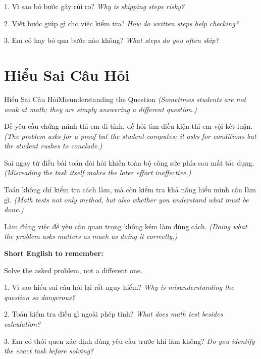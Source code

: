 \begin{tuhocnhanh}
1. Vì sao bỏ bước gây rủi ro? \textit{Why is skipping steps risky?}

2. Viết bước giúp gì cho việc kiểm tra? \textit{How do written steps help checking?}

3. Em có hay bỏ qua bước nào không? \textit{What steps do you often skip?}
\end{tuhocnhanh}
\ngancach

\section{Hiểu Sai Câu Hỏi}
\begin{truyen}{Hiểu Sai Câu Hỏi}{Misunderstanding the Question}
\textit{(Sometimes students are not weak at math; they are simply answering a different question.)}

Đề yêu cầu chứng minh thì em đi tính, đề hỏi tìm điều kiện thì em vội kết luận.
\textit{(The problem asks for a proof but the student computes; it asks for conditions but the student rushes to conclude.)}

Sai ngay từ điều bài toán đòi hỏi khiến toàn bộ công sức phía sau mất tác dụng.
\textit{(Misreading the task itself makes the later effort ineffective.)}

Toán không chỉ kiểm tra cách làm, mà còn kiểm tra khả năng hiểu mình cần làm gì.
\textit{(Math tests not only method, but also whether you understand what must be done.)}
\end{truyen}

\begin{baihoc}
Làm đúng việc đề yêu cầu quan trọng không kém làm đúng cách.
\textit{(Doing what the problem asks matters as much as doing it correctly.)}
\end{baihoc}

\begin{ghinhoanh}
\textbf{Short English to remember:}

Solve the asked problem, not a different one.

\end{ghinhoanh}

\begin{tuhocnhanh}
1. Vì sao hiểu sai câu hỏi lại rất nguy hiểm? \textit{Why is misunderstanding the question so dangerous?}

2. Toán kiểm tra điều gì ngoài phép tính? \textit{What does math test besides calculation?}

3. Em có thói quen xác định đúng yêu cầu trước khi làm không? \textit{Do you identify the exact task before solving?}
\end{tuhocnhanh}
\ngancach

